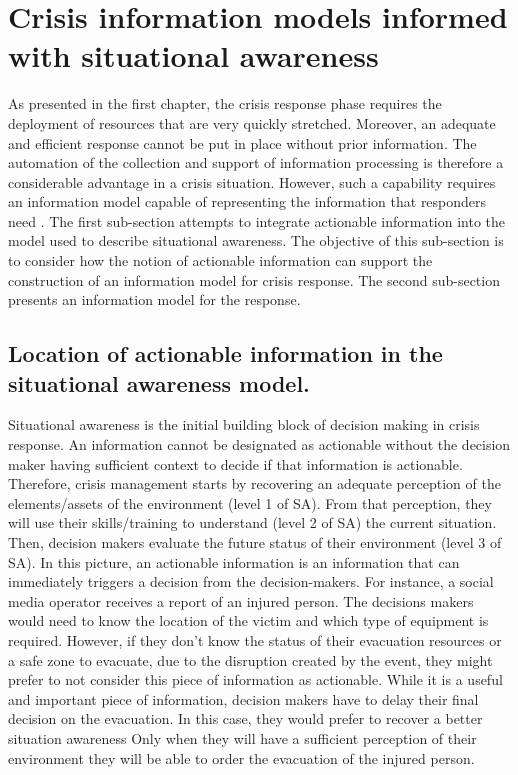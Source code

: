 \section{Crisis information models informed with situational awareness}
As presented in the first chapter, the crisis response phase requires the deployment of resources that are very quickly stretched.
Moreover, an adequate and efficient response cannot be put in place without prior information.
The automation of the collection and support of information processing is therefore a considerable advantage in a crisis situation.
However, such a capability requires an information model capable of representing the information that responders need \parencite{comesBringingStructureDisaster2015}.
The first sub-section attempts to integrate actionable information into the model used to describe situational awareness.
The objective of this sub-section is to consider how the notion of actionable information can support the construction of an information model for crisis response.
The second sub-section presents an information model for the response.

\subsection{Location of actionable information in the situational awareness model.}
Situational awareness is the initial building block of decision making in crisis response.
An information cannot be designated as actionable without the decision maker having sufficient context to decide if that information is actionable.
Therefore, crisis management starts by recovering an adequate perception of the elements/assets of the environment (level 1 of SA).
From that perception, they will use their skills/training to understand (level 2 of SA) the current situation.
Then, decision makers evaluate the future status of their environment (level 3 of SA).
In this picture, an actionable information is an information that can immediately triggers a decision from the decision-makers.
For instance, a social media operator receives a report of an injured person.
The decisions makers would need to know the location of the victim and which type of equipment is required.
However, if they don't know the status of their evacuation resources or a safe zone to evacuate,
due to the disruption created by the event, they might prefer to not consider this piece of information as actionable.
While it is a useful and important piece of information, decision makers have to delay their final decision on the evacuation.
In this case, they would prefer to recover a better situation awareness
Only when they will have a sufficient perception of their environment they will be able to order the evacuation of the injured person.

